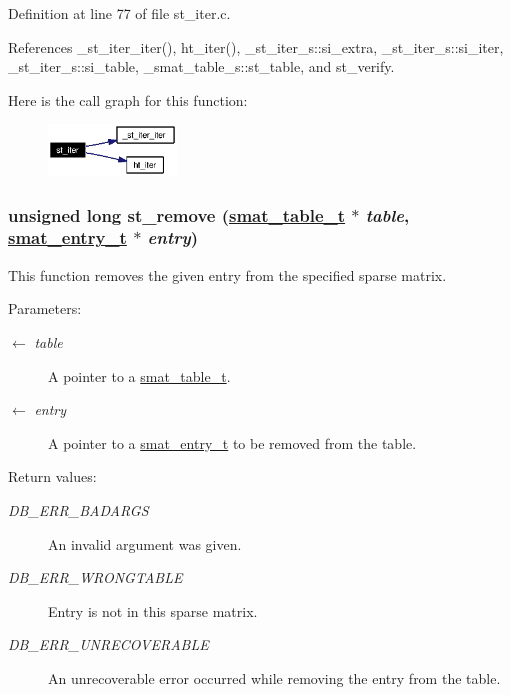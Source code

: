 Definition at line 77 of file st\_\-iter.c.

References \_\-st\_\-iter\_\-iter(), ht\_\-iter(), \_\-st\_\-iter\_\-s::si\_\-extra, \_\-st\_\-iter\_\-s::si\_\-iter, \_\-st\_\-iter\_\-s::si\_\-table, \_\-smat\_\-table\_\-s::st\_\-table, and st\_\-verify.

Here is the call graph for this function:\begin{figure}[H]
\begin{center}
\leavevmode
\includegraphics[width=97pt]{group__dbprim__smat_ga16_cgraph}
\end{center}
\end{figure}
\hypertarget{group__dbprim__smat_ga14}{
\subsubsection[st\_\-remove]{\setlength{\rightskip}{0pt plus 5cm}unsigned long st\_\-remove (\hyperlink{struct__smat__table__s}{smat\_\-table\_\-t} $\ast$ {\em table}, \hyperlink{struct__smat__entry__s}{smat\_\-entry\_\-t} $\ast$ {\em entry})}}
\label{group__dbprim__smat_ga14}


This function removes the given entry from the specified sparse matrix.

\begin{Desc}
\item[Parameters:]
\begin{description}
\item[\mbox{$\leftarrow$} {\em table}]A pointer to a \hyperlink{group__dbprim__smat_ga0}{smat\_\-table\_\-t}. \item[\mbox{$\leftarrow$} {\em entry}]A pointer to a \hyperlink{group__dbprim__smat_ga2}{smat\_\-entry\_\-t} to be removed from the table.\end{description}
\end{Desc}
\begin{Desc}
\item[Return values:]
\begin{description}
\item[{\em DB\_\-ERR\_\-BADARGS}]An invalid argument was given. \item[{\em DB\_\-ERR\_\-WRONGTABLE}]Entry is not in this sparse matrix. \item[{\em DB\_\-ERR\_\-UNRECOVERABLE}]An unrecoverable error occurred while removing the entry from the table.\end{description}
\end{Desc}


